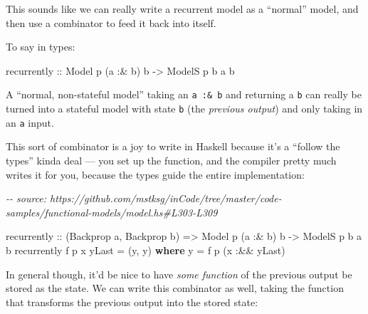 \documentclass[]{article}
\newenvironment{Shaded}{}{}
\newcommand{\CommentTok}[1]{\textcolor[rgb]{0.38,0.63,0.69}{\textit{#1}}}
\newcommand{\DataTypeTok}[1]{\textcolor[rgb]{0.56,0.13,0.00}{#1}}
\newcommand{\KeywordTok}[1]{\textcolor[rgb]{0.00,0.44,0.13}{\textbf{#1}}}
\newcommand{\NormalTok}[1]{#1}
\newcommand{\OperatorTok}[1]{\textcolor[rgb]{0.40,0.40,0.40}{#1}}
\newcommand{\OtherTok}[1]{\textcolor[rgb]{0.00,0.44,0.13}{#1}}
\begin{document}
This sounds like we can really write a recurrent model as a ``normal'' model,
and then use a combinator to feed it back into itself.

To say in types:

\begin{Shaded}
\begin{Highlighting}[]
\NormalTok{recurrently}
\OtherTok{    ::} \DataTypeTok{Model}\NormalTok{  p   (a }\OperatorTok{:\&}\NormalTok{ b) b}
    \OtherTok{{-}\textgreater{}} \DataTypeTok{ModelS}\NormalTok{ p b  a       b}
\end{Highlighting}
\end{Shaded}

A ``normal, non-stateful model'' taking an \texttt{a\ :\&\ b} and returning a
\texttt{b} can really be turned into a stateful model with state \texttt{b} (the
\emph{previous output}) and only taking in an \texttt{a} input.

This sort of combinator is a joy to write in Haskell because it's a ``follow the
types'' kinda deal --- you set up the function, and the compiler pretty much
writes it for you, because the types guide the entire implementation:

\begin{Shaded}
\begin{Highlighting}[]
\CommentTok{{-}{-} source: https://github.com/mstksg/inCode/tree/master/code{-}samples/functional{-}models/model.hs\#L303{-}L309}

\NormalTok{recurrently}
\OtherTok{    ::}\NormalTok{ (}\DataTypeTok{Backprop}\NormalTok{ a, }\DataTypeTok{Backprop}\NormalTok{ b)}
    \OtherTok{=\textgreater{}} \DataTypeTok{Model}\NormalTok{  p   (a }\OperatorTok{:\&}\NormalTok{ b) b}
    \OtherTok{{-}\textgreater{}} \DataTypeTok{ModelS}\NormalTok{ p b  a       b}
\NormalTok{recurrently f p x yLast }\OtherTok{=}\NormalTok{ (y, y)}
  \KeywordTok{where}
\NormalTok{    y }\OtherTok{=}\NormalTok{ f p (x }\OperatorTok{:\&\&}\NormalTok{ yLast)}
\end{Highlighting}
\end{Shaded}

In general though, it'd be nice to have \emph{some function} of the previous
output be stored as the state. We can write this combinator as well, taking the
function that transforms the previous output into the stored state:
\end{document}
